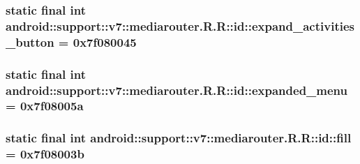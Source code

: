 \hypertarget{classandroid_1_1support_1_1v7_1_1mediarouter_1_1_r_1_1id_8eac945755504e35f986780fcc7a9ddd}{
\subsubsection[{expand\_\-activities\_\-button}]{\setlength{\rightskip}{0pt plus 5cm}static final int android::support::v7::mediarouter.R.R::id::expand\_\-activities\_\-button = 0x7f080045}}
\label{classandroid_1_1support_1_1v7_1_1mediarouter_1_1_r_1_1id_8eac945755504e35f986780fcc7a9ddd}


\hypertarget{classandroid_1_1support_1_1v7_1_1mediarouter_1_1_r_1_1id_70157b89291fa5f5da9217cb91f32ccf}{
\subsubsection[{expanded\_\-menu}]{\setlength{\rightskip}{0pt plus 5cm}static final int android::support::v7::mediarouter.R.R::id::expanded\_\-menu = 0x7f08005a}}
\label{classandroid_1_1support_1_1v7_1_1mediarouter_1_1_r_1_1id_70157b89291fa5f5da9217cb91f32ccf}


\hypertarget{classandroid_1_1support_1_1v7_1_1mediarouter_1_1_r_1_1id_ebd4e1b566f60a14c781bcc13c15fe71}{
\subsubsection[{fill}]{\setlength{\rightskip}{0pt plus 5cm}static final int android::support::v7::mediarouter.R.R::id::fill = 0x7f08003b}}
\label{classandroid_1_1support_1_1v7_1_1mediarouter_1_1_r_1_1id_ebd4e1b566f60a14c781bcc13c15fe71}


